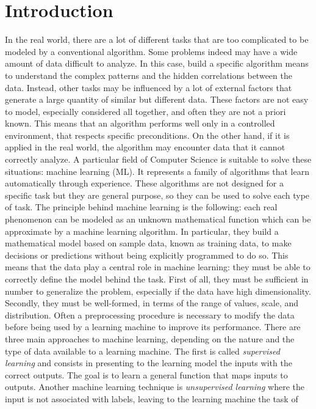 \section{Introduction}
In the real world, there are a lot of different tasks that are too
complicated to be modeled by a conventional algorithm. Some problems
indeed may have a wide amount of data difficult to analyze. In this
case, build a specific algorithm means to understand the complex
patterns and the hidden correlations between the data. Instead, other
tasks may be influenced by a lot of external factors that generate a
large quantity of similar but different data. These factors are not easy
to model, especially considered all together, and often they are not a
priori known. This means that an algorithm performs well only in a
controlled environment, that respects specific preconditions. On the
other hand, if it is applied in the real world, the algorithm may
encounter data that it cannot correctly analyze. A particular field of
Computer Science is suitable to solve these situations:
machine learning (ML). It represents a family of algorithms that learn
automatically through experience. These algorithms are not designed for
a specific task but they are general purpose, so they can be used to
solve each type of task. The principle behind machine learning is the
following: each real phenomenon can be modeled as an unknown
mathematical function which can be approximate by a machine learning
algorithm. In particular, they build a mathematical model based on
sample data, known as training data, to make decisions or predictions
without being explicitly programmed to do so. This means that the data
play a central role in machine learning: they must be able to correctly
define the model behind the task. First of all, they must be sufficient
in number to generalize the problem, especially if the data have high
dimensionality. Secondly, they must be well-formed, in terms of the
range of values, scale, and distribution. Often a preprocessing
procedure is necessary to modify the data before being used by a
learning machine to improve its performance. There are three main
approaches to machine learning, depending on the nature and the type of
data available to a learning machine. The first is called
\emph{supervised learning} and consists in presenting to the learning
model the inputs with the correct outputs. The goal is to learn a
general function that maps inputs to outputs. Another machine learning
technique is \emph{unsupervised learning} where the input is not
associated with labels, leaving to the learning machine the task of
